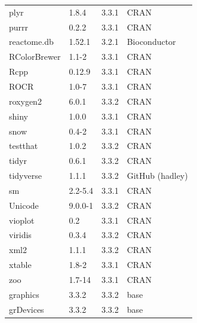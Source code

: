 \begin{longtable}{llll}
\rowcolor{black!5}
plyr         & 1.8.4          & 3.3.1 & CRAN            \\
\rowcolor{black!10}
purrr        & 0.2.2          & 3.3.1 & CRAN            \\
\rowcolor{black!5}
reactome.db  & 1.52.1         & 3.2.1 & Bioconductor    \\
\rowcolor{black!10}
RColorBrewer & 1.1-2          & 3.3.1 & CRAN            \\
\rowcolor{black!5}
Rcpp         & 0.12.9         & 3.3.1 & CRAN            \\
\rowcolor{black!10}
ROCR         & 1.0-7          & 3.3.1 & CRAN            \\
\rowcolor{black!5}
roxygen2     & 6.0.1          & 3.3.2 & CRAN            \\
\rowcolor{black!10}
shiny        & 1.0.0          & 3.3.1 & CRAN            \\
\rowcolor{black!5}
snow         & 0.4-2          & 3.3.1 & CRAN            \\
\rowcolor{black!10}
testthat     & 1.0.2          & 3.3.2 & CRAN            \\
\rowcolor{black!5}
tidyr        & 0.6.1          & 3.3.2 & CRAN            \\
\rowcolor{black!10}
tidyverse    & 1.1.1          & 3.3.2 & GitHub (hadley) \\
\rowcolor{black!5}
sm           & 2.2-5.4        & 3.3.1 & CRAN            \\
\rowcolor{black!10}
Unicode      & 9.0.0-1        & 3.3.2 & CRAN            \\
\rowcolor{black!5}
vioplot      & 0.2            & 3.3.1 & CRAN            \\
\rowcolor{black!10}
viridis      & 0.3.4          & 3.3.2 & CRAN            \\
\rowcolor{black!5}
xml2         & 1.1.1          & 3.3.2 & CRAN            \\
\rowcolor{black!10}
xtable       & 1.8-2          & 3.3.1 & CRAN            \\
\rowcolor{black!5}
zoo          & 1.7-14         & 3.3.1 & CRAN            \\
\rowcolor{black!10}
graphics     & 3.3.2          & 3.3.2 & base            \\
\rowcolor{black!5}
grDevices    & 3.3.2          & 3.3.2 & base            \\

\end{longtable}
